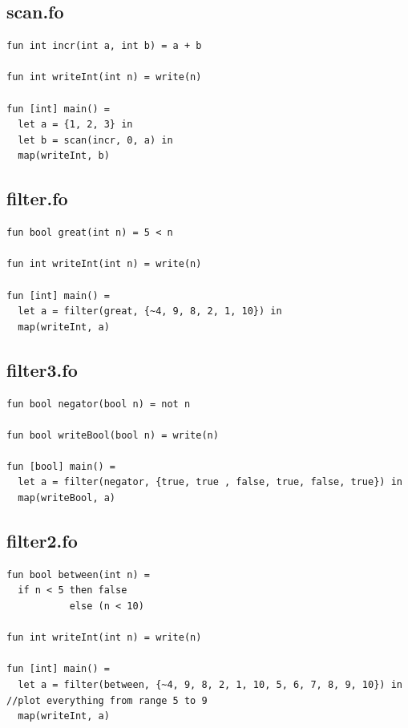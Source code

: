 \documentclass[11pt]{article}
\begin{document}
    \subsection{scan.fo}
    \begin{lstlisting}[basicstyle=\small]
fun int incr(int a, int b) = a + b

fun int writeInt(int n) = write(n)

fun [int] main() =
  let a = {1, 2, 3} in
  let b = scan(incr, 0, a) in
  map(writeInt, b)
    \end{lstlisting}

    \subsection{filter.fo}
    \begin{lstlisting}[basicstyle=\small]
fun bool great(int n) = 5 < n

fun int writeInt(int n) = write(n)

fun [int] main() =
  let a = filter(great, {~4, 9, 8, 2, 1, 10}) in
  map(writeInt, a)
    \end{lstlisting}

    \subsection{filter3.fo}
    \begin{lstlisting}[basicstyle=\small]
fun bool negator(bool n) = not n

fun bool writeBool(bool n) = write(n)

fun [bool] main() =
  let a = filter(negator, {true, true , false, true, false, true}) in
  map(writeBool, a)
    \end{lstlisting}

    \subsection{filter2.fo}
    \begin{lstlisting}[basicstyle=\small]
fun bool between(int n) =
  if n < 5 then false
           else (n < 10)

fun int writeInt(int n) = write(n)

fun [int] main() =
  let a = filter(between, {~4, 9, 8, 2, 1, 10, 5, 6, 7, 8, 9, 10}) in //plot everything from range 5 to 9
  map(writeInt, a)
    \end{lstlisting}
\end{document}
